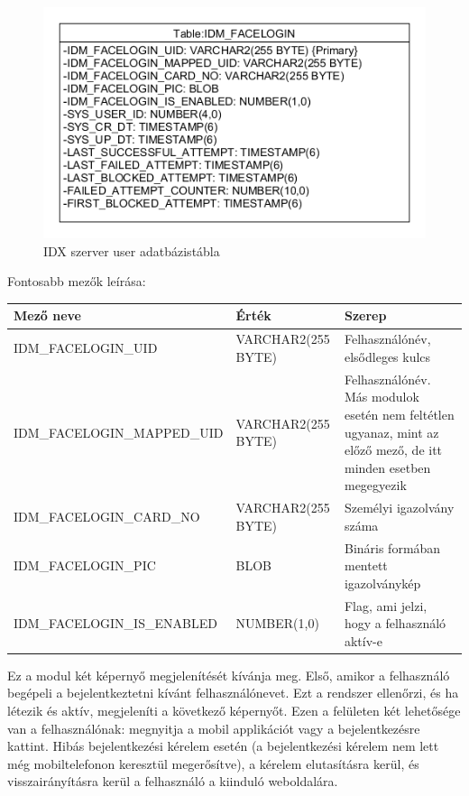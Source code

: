 \begin{figure}[h]
 \begin{minipage}{1\textwidth} 
\centering
    \includegraphics[scale=0.7]{img/facelogin_idm_db}
    \caption{IDX szerver user adatbázistábla}
 \end{minipage}
\end{figure}

Fontosabb mezők leírása:

\begin{tabular}{|p{6.5cm}|p{3cm} |p{4cm}|}
   	\hline
	\textbf{Mező neve} & \textbf{Érték} & \textbf{Szerep}\\ \hline
	IDM\_FACELOGIN\_UID & VARCHAR2(255 BYTE) & Felhasználónév, elsődleges kulcs \\ \hline
	IDM\_FACELOGIN\_MAPPED\_UID & VARCHAR2(255 BYTE) & Felhasználónév. Más modulok esetén nem feltétlen ugyanaz, mint az előző mező, de itt minden esetben megegyezik \\ \hline
	IDM\_FACELOGIN\_CARD\_NO & VARCHAR2(255 BYTE)& Személyi igazolvány száma \\ \hline
	IDM\_FACELOGIN\_PIC & BLOB & Bináris formában mentett igazolványkép \\ \hline
	IDM\_FACELOGIN\_IS\_ENABLED & NUMBER(1,0) & Flag, ami jelzi, hogy a felhasználó aktív-e \\ \hline
	\end{tabular}


Ez a modul két képernyő megjelenítését kívánja meg. Első, amikor a felhasználó begépeli a bejelentkeztetni kívánt felhasználónevet. Ezt a rendszer ellenőrzi, és ha létezik és aktív, megjeleníti a következő képernyőt. Ezen a felületen két lehetősége van a felhasználónak: megnyitja a mobil applikációt vagy a bejelentkezésre kattint. Hibás bejelentkezési kérelem esetén (a bejelentkezési kérelem nem lett még mobiltelefonon keresztül megerősítve), a kérelem elutasításra kerül, és visszairányításra kerül a felhasználó a kiinduló weboldalára.

